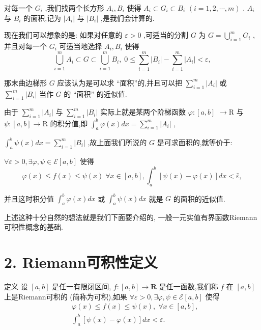 对每一个 ${G}_{i}$ ,我们找两个长方形 ${A}_{i},{B}_{i}$ 使得 ${A}_{i} \subset  {G}_{i} \subset  {B}_{i}$  $\left( {i = 1,2,\cdots ,m}\right)$ . ${A}_{i}$ 与 ${B}_{i}$ 的面积,记为 $\left| {A}_{i}\right|$ 与 $\left| {B}_{i}\right|$ ,是我们会计算的.

现在我们可以想象的是: 如果对任意的 $\varepsilon  > 0$ ,可适当的分割 $G$ 为 $G = \mathop{\bigcup }\limits_{{i = 1}}^{m}{G}_{i}$ ,并且对每一个 ${G}_{i}$ 可适当地选择 ${A}_{i},{B}_{i}$ 使得
$$\mathop{\bigcup }\limits_{{i = 1}}^{m}{A}_{i} \subset  G \subset  \mathop{\bigcup }\limits_{{i = 1}}^{m}{B}_{i},\;0 \leq  \mathop{\sum }\limits_{{i = 1}}^{m}\left| {B}_{i}\right|  - \mathop{\sum }\limits_{{i = 1}}^{m}\left| {A}_{i}\right|  < \varepsilon ,$$

那末曲边梯形 $G$ 应该认为是可以求 “面积”的,并且可以把 $\mathop{\sum }\limits_{{i = 1}}^{m}\left| {A}_{i}\right|$ 或 $\mathop{\sum }\limits_{{i = 1}}^{m}\left| {B}_{i}\right|$ 当作 $G$ 的 “面积” 的近似值.

由于 $\mathop{\sum }\limits_{{i = 1}}^{m}\left| {A}_{i}\right|$ 与 $\mathop{\sum }\limits_{{i = 1}}^{m}\left| {B}_{i}\right|$ 实际上就是某两个阶梯函数 $\varphi  : \left\lbrack  {a,b}\right\rbrack$  $\rightarrow  \mathrm{R}$ 与 $\psi  : \left\lbrack  {a,b}\right\rbrack   \rightarrow  \mathrm{R}$ 的积分值,即 ${\int }_{a}^{b}\varphi \left( x\right) {dx} = \mathop{\sum }\limits_{{i = 1}}^{m}\left| {A}_{i}\right|$ ,

${\int }_{a}^{b}\psi \left( x\right) {dx} = \mathop{\sum }\limits_{{i = 1}}^{m}\left| {B}_{i}\right|$ ,故上面我们所说的 $G$ 是可求面积的,就等价于:

$\forall \varepsilon  > 0,\exists \varphi ,\psi  \in  \mathcal{E}\left\lbrack  {a,b}\right\rbrack$ 使得
$$\varphi \left( x\right)  \leq  f\left( x\right)  \leq  \psi \left( x\right) \;\forall x \in  \left\lbrack  {a,b}\right\rbrack  ,{\int }_{a}^{b}\left\lbrack  {\psi \left( x\right)  - \varphi \left( x\right) }\right\rbrack  {dx} < \bar{\varepsilon },$$

并且这时积分值 ${\int }_{a}^{b}\varphi \left( x\right) {dx}$ 或 ${\int }_{a}^{b}\psi \left( x\right) {dx}$ 就是 $G$ 的面积的近似值.

上述这种十分自然的想法就是我们下面要介绍的, 一般一元实值有界函数Riemann可积性概念的基础.

\section*{2. Riemann可积性定义}

定义 设 $\left\lbrack  {a,b}\right\rbrack$ 是任一有限闭区间, $f : \left\lbrack  {a,b}\right\rbrack   \rightarrow  \mathbf{R}$ 是任一函数,我们称 $f$ 在 $\left\lbrack  {a,b}\right\rbrack$ 上是Riemann可积的 (简称为可积),如果 $\forall \varepsilon  > 0,\exists \varphi ,\psi  \in  \mathcal{E}\left\lbrack  {a,b}\right\rbrack$ 使得
\begin{align*}
	&\varphi \left( x\right)  \leq  f\left( x\right)  \leq  \psi \left( x\right) ,\;\forall x \in  \left\lbrack  {a,b}\right\rbrack  ,\\
	&{\int }_{a}^{b}\left\lbrack  {\psi \left( x\right)  - \varphi \left( x\right) }\right\rbrack  {dx} < \varepsilon .
\end{align*}

